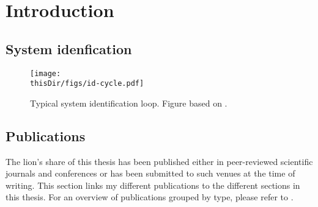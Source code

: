 \chapter{Introduction}
\def\thisDir{ch01-intro}
  \section{System idenfication}


\begin{figure}

  \centering
  \texttt{[image: \\thisDir/figs/id-cycle.pdf]}
  \caption[Identification loop]{Typical system identification loop. Figure based on \citep[Figure 1.10]{Ljung1999}.}
  \label{fig:intro:identification-cycle}
\end{figure}

   \section{Publications}
   The lion's share of this thesis has been published either in peer-reviewed scientific journals and conferences or has been submitted to such venues at the time of writing.
   This section links my different publications to the different sections in this thesis.
   For an overview of publications grouped by type, please refer to \pageref{publicationList}.

